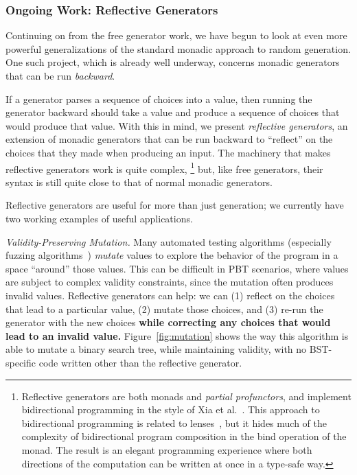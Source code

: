 \subsubsection{Ongoing Work: Reflective Generators}
Continuing on from the free generator work, we have begun to look at even more
powerful generalizations of the standard monadic approach to random generation.
One such project, which is already well underway, concerns monadic generators
that can be run {\em backward}.

If a generator parses a sequence of choices into a value, then running the
generator backward should take a value and produce a sequence of choices that
would produce that value. With this in mind, we present {\em reflective
generators}, an extension of monadic generators that can be run backward to
``reflect'' on the choices that they made when producing an input. The machinery
that makes reflective generators work is quite complex,%
\footnote{Reflective generators are both monads and {\em partial profunctors},
and implement bidirectional programming in the style of Xia et
al.~\cite{xia2019composing}. This approach to bidirectional programming is
related to lenses~\cite{foster2009bidirectional}, but it hides much of the
complexity of bidirectional program composition in the bind operation of the
monad. The result is an elegant programming experience where both directions of
the computation can be written at once in a type-safe way.}
but, like free generators, their syntax is still quite close to that of normal
monadic generators.

Reflective generators are useful for more than just generation; we currently
have two working examples of useful applications.

{\em Validity-Preserving Mutation.} Many automated testing algorithms
(especially fuzzing algorithms~\cite{afl-readme}) {\em mutate} values to explore
the behavior of the program in a space ``around'' those values. This can be
difficult in PBT scenarios, where values are subject to complex validity
constraints, since the mutation often produces invalid values. Reflective
generators can help: we can (1) reflect on the choices that lead to a particular
value, (2) mutate those choices, and (3) re-run the generator with the new
choices {\bf while correcting any choices that
would lead to an invalid value.} Figure~\ref{fig:mutation} shows the way this
algorithm is able to mutate a binary search tree, while maintaining validity,
with no BST-specific code written other than the reflective generator.

